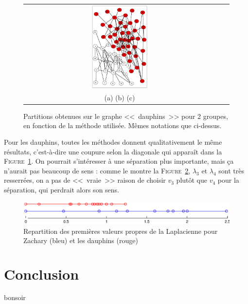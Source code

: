 \documentclass[12pt]{article}
\newcommand{\fig}[1]{\textsc{Figure}~\ref{#1}}
\begin{document}
\begin{figure}[bth]
	\begin{center}
		\begin{tabular}[h]{ccc}
		\includegraphics[width=0.30\textwidth]{do-m2-2}
		\vspace{-5mm}
		\\
		(a) (b) (c)
		\end{tabular}
	\end{center}
	\caption{Partitions obtenues sur le graphe <<~dauphins~>> pour 2 groupes, en fonction de la méthode utilisée. Mêmes notations que
	ci-dessus.}
	\label{fig:partitions-do}
\end{figure}

Pour les dauphins, toutes les méthodes donnent qualitativement le même résultats, c'est-à-dire une coupure selon la diagonale qui
apparaît dans la \fig{fig:partitions-do}. On pourrait s'intéresser à une séparation plus importante, mais ça n'aurait pas beaucoup
de sens : comme le montre la \fig{fig:spectres}, $\lambda_3$ et $\lambda_4$ sont très resserrées, on a pas de <<~vraie~>> raison
de choisir $v_3$ plutôt que $v_4$ pour la séparation, qui perdrait alors son sens.

\begin{figure}[htb]
	\begin{center}
		\includegraphics[width=\textwidth]{new_plots/spectres}
	\end{center}
	\caption{Repartition des premières valeurs propres de la Laplacienne pour Zachary (bleu) et les dauphins (rouge)}
	\label{fig:spectres}
\end{figure}

\section{Conclusion}
bonsoir
\end{document}
